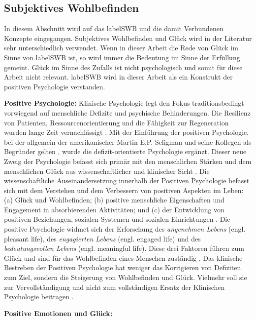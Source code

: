 \subsection{Subjektives Wohlbefinden}\label{subsection.subjektivesWohlbefinden}
In diesem Abschnitt wird auf das \gls{labelSWB} und die damit Verbundenen Konzepte eingegangen. Subjektives Wohlbefinden und Glück wird in der Literatur sehr unterschiedlich verwendet. Wenn in dieser Arbeit die Rede von Glück im Sinne von \gls{labelSWB} ist, so wird immer die Bedeutung im Sinne der Erfüllung gemeint. Glück im Sinne des Zufalls ist nicht psychologisch und somit für diese Arbeit nicht relevant. \Gls{labelSWB} wird in dieser Arbeit als ein Konstrukt der positiven Psychologie verstanden. 
\par
\textbf{Positive Psychologie:} 
Klinische Psychologie legt den Fokus traditionsbedingt vorwiegend auf menschliche Defizite und psychische Behinderungen. Die Resilienz von Patienten, Ressourcenorientierung und die Fähigkeit zur Regeneration wurden lange Zeit vernachlässigt \cite{Carr2011}. Mit der Einführung der positiven Psychologie, bei der allgemein der amerikanischer Martin E.P. Seligman und seine Kollegen als Begründer gelten \cite{Seligman2003}, wurde die defizit-orientierte Psychologie ergänzt. Dieser neue Zweig der Psychologie befasst sich primär mit den menschlichen Stärken und dem menschlichen Glück aus wissenschaftlicher und klinischer Sicht \cite{Carr2011}. Die wissenschaftliche Auseinandersetzung innerhalb der Positiven Psychologie befasst sich mit dem Verstehen und dem Verbessern von positiven Aspekten im Leben: (a) Glück und Wohlbefinden; (b) positive menschliche Eigenschaften und Engagement in absorbierenden Aktivitäten; und (c) der Entwicklung von positiven Beziehungen, sozialen Systemen und sozialen Einrichtungen \cite{Lopez2009, Seligman2003}. Die positive Psychologie widmet sich der Erforschung des \textit{angenehmen Lebens} (engl. pleasant life), des \textit{engagierten Lebens} (engl. engaged life) und des \textit{bedeutungsvollen Lebens} (engl. meaningful life). Diese drei Faktoren führen zum Glück und sind für das Wohlbefinden eines Menschen zuständig \cite{Peterson2005}. Das klinische Bestreben der Positiven Psychologie hat weniger das Korrigieren von Defiziten zum Ziel, sondern die Steigerung von Wohlbefinden und Glück. Vielmehr soll sie zur Vervollständigung und nicht zum vollständigen Ersatz der Klinischen Psychologie beitragen \cite{Carr2011}.
\par
\textbf{Positive Emotionen und Glück:} 
